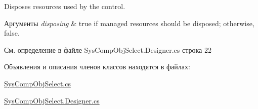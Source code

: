 Disposes resources used by the control. 


\begin{DoxyParams}{Аргументы}
{\em disposing} & true if managed resources should be disposed; otherwise, false.\\
\hline
\end{DoxyParams}


См. определение в файле Sys\+Comp\+Obj\+Select.\+Designer.\+cs строка 22



Объявления и описания членов классов находятся в файлах\+:\begin{DoxyCompactItemize}
\item 
\mbox{\hyperlink{_sys_comp_obj_select_8cs}{Sys\+Comp\+Obj\+Select.\+cs}}\item 
\mbox{\hyperlink{_sys_comp_obj_select_8_designer_8cs}{Sys\+Comp\+Obj\+Select.\+Designer.\+cs}}\end{DoxyCompactItemize}
